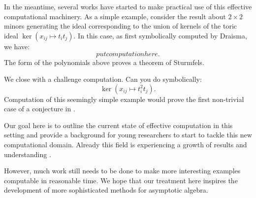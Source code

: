 In the meantime, several works have started to make practical use of this effective computational machinery.  As a simple example, consider the result about $2 \times 2$ minors generating the ideal corresponding to the union of kernels of the toric ideal $\ker{(x_{ij} \mapsto t_i t_j)}$.  In this case, as first symbolically computed by Draisma, we have:
\[ put computation here.\]
The form of the polynomials above proves a theorem of Sturmfels.

We close with a challenge computation.  Can you do symbolically:
\[ \ker{(x_{ij} \mapsto t_i^2 t_j)}.\]
Computation of this seemingly simple example would prove the first non-trivial case of a conjecture in \cite{aschenbrenner2007finite}.

Our goal here is to outline the current state of effective computation in this setting and provide a background for young researchers to start to tackle this new computational domain.  Already this field is experiencing a growth of results and understanding \cite{Nagel, krone2016hilbert}.

However, much work still needs to be done to make more interesting examples computable in reasonable time.  We hope that our treatment here inspires the development of more sophisticated methods for asymptotic algebra.








